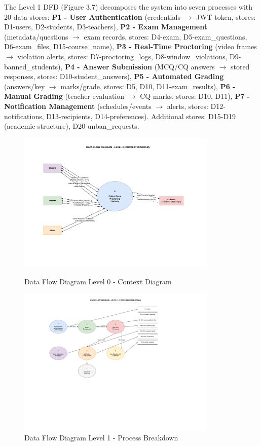 The Level 1 DFD (Figure 3.7) decomposes the system into seven processes with 20 data stores: \textbf{P1 - User Authentication} (credentials $\rightarrow$ JWT token, stores: D1-users, D2-students, D3-teachers), \textbf{P2 - Exam Management} (metadata/questions $\rightarrow$ exam records, stores: D4-exam, D5-exam\_questions, D6-exam\_files, D15-course\_name), \textbf{P3 - Real-Time Proctoring} (video frames $\rightarrow$ violation alerts, stores: D7-proctoring\_logs, D8-window\_violations, D9-banned\_students), \textbf{P4 - Answer Submission} (MCQ/CQ answers $\rightarrow$ stored responses, stores: D10-student\_answers), \textbf{P5 - Automated Grading} (answers/key $\rightarrow$ marks/grade, stores: D5, D10, D11-exam\_results), \textbf{P6 - Manual Grading} (teacher evaluation $\rightarrow$ CQ marks, stores: D10, D11), \textbf{P7 - Notification Management} (schedules/events $\rightarrow$ alerts, stores: D12-notifications, D13-recipients, D14-preferences). Additional stores: D15-D19 (academic structure), D20-unban\_requests.

\begin{figure}[p]
    \centering
    \includegraphics[width=0.85\textwidth]{Chap3/dfd_level0}
    \caption{Data Flow Diagram Level 0 - Context Diagram}
    \label{fig:dfd0}

    \vspace{1cm}

    \includegraphics[width=0.85\textwidth]{Chap3/dfd_level1}
    \caption{Data Flow Diagram Level 1 - Process Breakdown}
    \label{fig:dfd1}
\end{figure}

